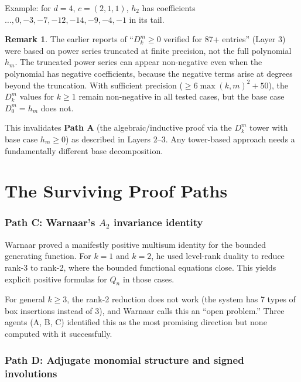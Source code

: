\documentclass[11pt]{article}
\theoremstyle{definition}
\newtheorem{remark}[theorem]{Remark}
\begin{document}
\noindent Example: for $d = 4$, $c = (2,1,1)$, $h_2$ has coefficients $\ldots, 0, -3, -7, -12, -14, -9, -4, -1$ in its tail.

\begin{remark}
The earlier reports of ``$D_k^m \geq 0$ verified for 87+ entries'' (Layer 3) were based on power series truncated at finite precision, not the full polynomial $h_m$. The truncated power series can appear non-negative even when the polynomial has negative coefficients, because the negative terms arise at degrees beyond the truncation. With sufficient precision ($\geq 6 \max(k,m)^2 + 50$), the $D_k^m$ values for $k \geq 1$ remain non-negative in all tested cases, but the base case $D_0^m = h_m$ does not.
\end{remark}

This invalidates \textbf{Path A} (the algebraic/inductive proof via the $D_k^m$ tower with base case $h_m \geq 0$) as described in Layers 2--3. Any tower-based approach needs a fundamentally different base decomposition.


\part{The Surviving Proof Paths}

\section{Path C: Warnaar's \texorpdfstring{$A_2$}{A2} invariance identity}

Warnaar proved a manifestly positive multisum identity for the bounded generating function. For $k = 1$ and $k = 2$, he used level-rank duality to reduce rank-3 to rank-2, where the bounded functional equations close. This yields explicit positive formulas for $Q_n$ in those cases.

For general $k \geq 3$, the rank-2 reduction does not work (the system has 7 types of box insertions instead of 3), and Warnaar calls this an ``open problem.'' Three agents (A, B, C) identified this as the most promising direction but none computed with it successfully.

\section{Path D: Adjugate monomial structure and signed involutions}
\end{document}
